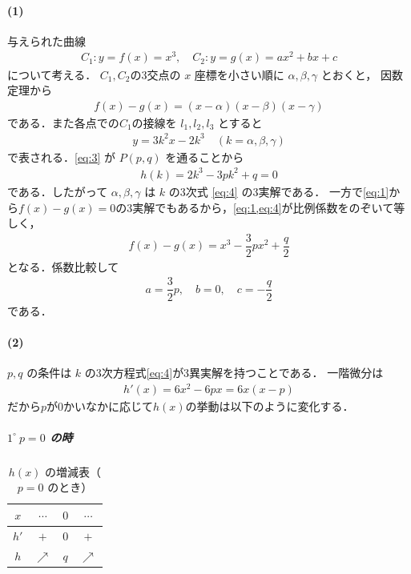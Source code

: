 \documentclass[../../main.tex]{subfiles}
\begin{document}
\paragraph{(1)}

与えられた曲線
\begin{align}
  C_1:y=f(x)=x^3,
  \quad
  C_2:y=g(x)=ax^2+bx+c \label{eq:1}
\end{align}
について考える．
$C_1,C_2$の3交点の $x$ 座標を小さい順に $\alpha, \beta, \gamma$ とおくと，
因数定理から
\begin{align}
  f(x)-g(x) = (x-\alpha)(x-\beta)(x-\gamma) \label{eq:2}
\end{align}
である．また各点での$C_1$の接線を $l_1, l_2, l_3$ とすると
\begin{align}
  y = 3k^2 x - 2k^3 \quad (k=\alpha, \beta, \gamma) \label{eq:3}
\end{align}
で表される．\cref{eq:3} が $P(p,q)$ を通ることから
\begin{align}
  h(k) = 2k^3 - 3pk^2 + q = 0 \label{eq:4}
\end{align}
である．したがって $\alpha, \beta, \gamma$ は $k$ の3次式 \cref{eq:4} の3実解である．
一方で\cref{eq:1}から$f(x)-g(x)=0$の3実解でもあるから，\cref{eq:1,eq:4}が比例係数をのぞいて等しく，
\begin{align}
  f(x)-g(x) = x^3 - \dfrac{3}{2}p x^2 + \dfrac{q}{2}
\end{align}
となる．係数比較して
\begin{align}
  a = \dfrac{3}{2}p, \quad b = 0, \quad c = -\dfrac{q}{2} \label{eq:5}
\end{align}
である．

\paragraph{(2)}

$p, q$ の条件は $k$ の3次方程式\cref{eq:4}が3異実解を持つことである．
一階微分は
\begin{align}
  h'(x) = 6x^2 - 6px = 6x(x-p) \label{eq:6}
\end{align}
だから$p$が$0$かいなかに応じて$h(x)$の挙動は以下のように変化する．

\subparagraph{$1^\circ \ p = 0$ の時}

\begin{table}[htb]
  \centering
  \caption{$h(x)$ の増減表（$p=0$ のとき）}
  \label{tab:variation_p0}
  \begin{tabular}{|c|c|c|c|}
    \hline
    $x$ & $\cdots$ & $0$ & $\cdots$ \\
    \hline
    $h'$ & $+$ & $0$ & $+$ \\
    \hline
    $h$ & $\nearrow$ & $q$ & $\nearrow$ \\
    \hline
  \end{tabular}
\end{table}
\end{document}
